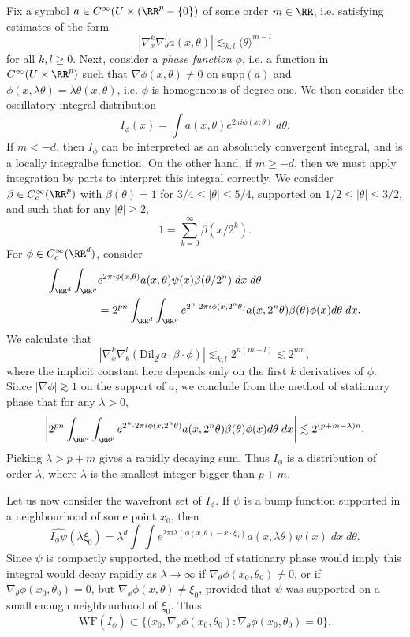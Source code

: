 Fix a symbol $a \in C^\infty(U \times (\RR^p - \{ 0 \})$ of some order $m \in \RR$, i.e. satisfying estimates of the form
%
\[ |\nabla_x^k \nabla_\theta^l a(x,\theta)| \lesssim_{k,l} \langle \theta \rangle^{m - l} \]
%
for all $k,l \geq 0$. Next, consider a \emph{phase function} $\phi$, i.e. a function in $C^\infty(U \times \RR^p)$ such that $\nabla \phi(x,\theta) \neq 0$ on $\text{supp}(a)$ and $\phi(x,\lambda \theta) = \lambda \theta(x,\theta)$, i.e. $\phi$ is homogeneous of degree one. We then consider the oscillatory integral distribution
%
\[ I_\phi(x) = \int a(x,\theta) e^{2\pi i \phi(x,\theta)}\; d\theta. \]
%
If $m < -d$, then $I_\phi$ can be interpreted as an absolutely convergent integral, and is a locally integralbe function. On the other hand, if $m \geq -d$, then we must apply integration by parts to interpret this integral correctly. We consider $\beta \in C_c^\infty(\RR^p)$ with $\beta(\theta) = 1$ for $3/4 \leq |\theta| \leq 5/4$, supported on $1/2 \leq |\theta| \leq 3/2$, and such that for any $|\theta| \geq 2$,
%
\[ 1 = \sum_{k=0}^\infty \beta(x/2^k). \]
%
For $\phi \in C_c^\infty(\RR^d)$, consider
%
\begin{align*}
    \int_{\RR^d} \int_{\RR^p} &e^{2 \pi i \phi(x,\theta)} a(x,\theta) \psi(x) \beta(\theta/2^n)\; dx\; d\theta \\
    &= 2^{pn} \int_{\RR^d} \int_{\RR^p} e^{2^n \cdot 2\pi i \phi(x,2^n \theta)} a(x,2^n \theta) \beta(\theta) \phi(x) d\theta\; dx.
\end{align*}
%
We calculate that
%
\[ |\nabla_x^k \nabla_\theta^l (\text{Dil}_{2^l} a \cdot \beta \cdot \phi)| \lesssim_{k,l} 2^{n(m-l)} \lesssim 2^{nm}, \]
%
where the implicit constant here depends only on the first $k$ derivatives of $\phi$. Since $|\nabla \phi| \gtrsim 1$ on the support of $a$, we conclude from the method of stationary phase that for any $\lambda > 0$,
%
\[ \left| 2^{pn} \int_{\RR^d} \int_{\RR^p} e^{2^n \cdot 2\pi i \phi(x,2^n \theta)} a(x,2^n \theta) \beta(\theta) \phi(x) d\theta\; dx \right| \lesssim 2^{(p + m - \lambda)n}. \]
%
Picking $\lambda > p + m$ gives a rapidly decaying sum. Thus $I_\phi$ is a distribution of order $\lambda$, where $\lambda$ is the smallest integer bigger than $p + m$.

Let us now consider the wavefront set of $I_\phi$. If $\psi$ is a bump function supported in a neighbourhood of some point $x_0$, then
%
\[ \widehat{I_\phi \psi}(\lambda \xi_0) = \lambda^d \int \int e^{2 \pi i \lambda (\phi(x,\theta) - x \cdot \xi_0)} a(x,\lambda \theta) \psi(x)\; dx\; d\theta. \]
%
Since $\psi$ is compactly supported, the method of stationary phase would imply this integral would decay rapidly as $\lambda \to \infty$ if $\nabla_\theta \phi(x_0,\theta_0) \neq 0$, or if $\nabla_\theta \phi(x_0,\theta_0) = 0$, but $\nabla_x \phi(x,\theta) \neq \xi_0$, provided that $\psi$ was supported on a small enough neighbourhood of $\xi_0$. Thus
%
\[ \text{WF}(I_\phi) \subset \{ (x_0,\nabla_x \phi(x_0,\theta_0): \nabla_\theta \phi(x_0,\theta_0) = 0 \}. \]

